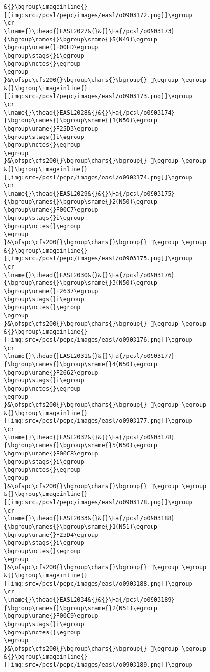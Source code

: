 \begin{verbatim}
&{}\bgroup\imageinline{}[[img:src=/pcsl/pepc/images/easl/o0903172.png]]\egroup
\cr
\lname{}\thead{}EASL2027&{}&{}\Ha{/pcsl/o0903173}{\bgroup\names{}\bgroup\sname{}5(N49)\egroup
\bgroup\uname{}F00ED\egroup
\bgroup\stags{}i\egroup
\bgroup\notes{}\egroup
\egroup
}&\ofspc\ofs200{}\bgroup\chars{}\bgroup{} 󰃭\egroup \egroup
&{}\bgroup\imageinline{}[[img:src=/pcsl/pepc/images/easl/o0903173.png]]\egroup
\cr
\lname{}\thead{}EASL2028&{}&{}\Ha{/pcsl/o0903174}{\bgroup\names{}\bgroup\sname{}1(N50)\egroup
\bgroup\uname{}F25D3\egroup
\bgroup\stags{}i\egroup
\bgroup\notes{}\egroup
\egroup
}&\ofspc\ofs200{}\bgroup\chars{}\bgroup{} 󲗓\egroup \egroup
&{}\bgroup\imageinline{}[[img:src=/pcsl/pepc/images/easl/o0903174.png]]\egroup
\cr
\lname{}\thead{}EASL2029&{}&{}\Ha{/pcsl/o0903175}{\bgroup\names{}\bgroup\sname{}2(N50)\egroup
\bgroup\uname{}F00C7\egroup
\bgroup\stags{}i\egroup
\bgroup\notes{}\egroup
\egroup
}&\ofspc\ofs200{}\bgroup\chars{}\bgroup{} 󰃇\egroup \egroup
&{}\bgroup\imageinline{}[[img:src=/pcsl/pepc/images/easl/o0903175.png]]\egroup
\cr
\lname{}\thead{}EASL2030&{}&{}\Ha{/pcsl/o0903176}{\bgroup\names{}\bgroup\sname{}3(N50)\egroup
\bgroup\uname{}F2637\egroup
\bgroup\stags{}i\egroup
\bgroup\notes{}\egroup
\egroup
}&\ofspc\ofs200{}\bgroup\chars{}\bgroup{} 󲘷\egroup \egroup
&{}\bgroup\imageinline{}[[img:src=/pcsl/pepc/images/easl/o0903176.png]]\egroup
\cr
\lname{}\thead{}EASL2031&{}&{}\Ha{/pcsl/o0903177}{\bgroup\names{}\bgroup\sname{}4(N50)\egroup
\bgroup\uname{}F2662\egroup
\bgroup\stags{}i\egroup
\bgroup\notes{}\egroup
\egroup
}&\ofspc\ofs200{}\bgroup\chars{}\bgroup{} 󲙢\egroup \egroup
&{}\bgroup\imageinline{}[[img:src=/pcsl/pepc/images/easl/o0903177.png]]\egroup
\cr
\lname{}\thead{}EASL2032&{}&{}\Ha{/pcsl/o0903178}{\bgroup\names{}\bgroup\sname{}5(N50)\egroup
\bgroup\uname{}F00C8\egroup
\bgroup\stags{}i\egroup
\bgroup\notes{}\egroup
\egroup
}&\ofspc\ofs200{}\bgroup\chars{}\bgroup{} 󰃈\egroup \egroup
&{}\bgroup\imageinline{}[[img:src=/pcsl/pepc/images/easl/o0903178.png]]\egroup
\cr
\lname{}\thead{}EASL2033&{}&{}\Ha{/pcsl/o0903188}{\bgroup\names{}\bgroup\sname{}1(N51)\egroup
\bgroup\uname{}F25D4\egroup
\bgroup\stags{}i\egroup
\bgroup\notes{}\egroup
\egroup
}&\ofspc\ofs200{}\bgroup\chars{}\bgroup{} 󲗔\egroup \egroup
&{}\bgroup\imageinline{}[[img:src=/pcsl/pepc/images/easl/o0903188.png]]\egroup
\cr
\lname{}\thead{}EASL2034&{}&{}\Ha{/pcsl/o0903189}{\bgroup\names{}\bgroup\sname{}2(N51)\egroup
\bgroup\uname{}F00C9\egroup
\bgroup\stags{}i\egroup
\bgroup\notes{}\egroup
\egroup
}&\ofspc\ofs200{}\bgroup\chars{}\bgroup{} 󰃉\egroup \egroup
&{}\bgroup\imageinline{}[[img:src=/pcsl/pepc/images/easl/o0903189.png]]\egroup

\end{verbatim}
